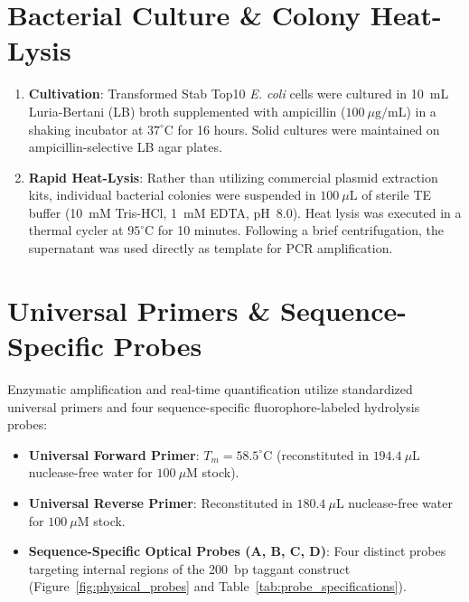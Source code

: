 \section{Bacterial Culture \& Colony Heat-Lysis}
\begin{enumerate}
    \item \textbf{Cultivation}: Transformed Stab Top10 \textit{E. coli} cells were cultured in 10~mL Luria-Bertani (LB) broth supplemented with ampicillin ($100~\mu\text{g/mL}$) in a shaking incubator at $37^\circ\text{C}$ for 16 hours. Solid cultures were maintained on ampicillin-selective LB agar plates.
    \item \textbf{Rapid Heat-Lysis}: Rather than utilizing commercial plasmid extraction kits, individual bacterial colonies were suspended in $100~\mu\text{L}$ of sterile TE buffer (10~mM Tris-HCl, 1~mM EDTA, pH~8.0). Heat lysis was executed in a thermal cycler at $95^\circ\text{C}$ for 10 minutes. Following a brief centrifugation, the supernatant was used directly as template for PCR amplification.
\end{enumerate}

\section{Universal Primers \& Sequence-Specific Probes}
Enzymatic amplification and real-time quantification utilize standardized universal primers and four sequence-specific fluorophore-labeled hydrolysis probes:
\begin{itemize}
    \item \textbf{Universal Forward Primer}: $T_m = 58.5^\circ\text{C}$ (reconstituted in $194.4~\mu\text{L}$ nuclease-free water for $100~\mu\text{M}$ stock).
    \item \textbf{Universal Reverse Primer}: Reconstituted in $180.4~\mu\text{L}$ nuclease-free water for $100~\mu\text{M}$ stock.
    \item \textbf{Sequence-Specific Optical Probes (A, B, C, D)}: Four distinct probes targeting internal regions of the 200~bp taggant construct (Figure~\ref{fig:physical_probes} and Table~\ref{tab:probe_specifications}).
\end{itemize}

